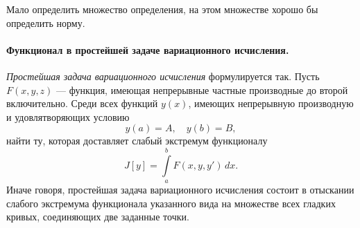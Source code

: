 Мало определить множество определения, на этом множестве хорошо бы определить
норму. 


\paragraph{Функционал в простейшей задаче вариационного
исчисления.} \emph{Простейшая задача вариационного исчисления} формулируется
так. Пусть $ F(x, y, z) $ --- функция, имеющая непрерывные частные производные
до второй включительно. Среди всех функций $ y(x) $, имеющих непрерывную
производную и удовлятворяющих условию  
\[
    y(a) = A, \quad y(b) = B,
\]
найти ту, которая доставляет слабый экстремум функционалу  
\begin{equation}\label{eq:func}
  J[y] = \int\limits_{a}^{b}F(x, y, y')\,dx.
\end{equation}
Иначе говоря, простейшая задача вариационного исчисления состоит
в отыскании слабого экстремума функционала указанного вида на множестве
всех гладких кривых, соединяющих две заданные точки.

